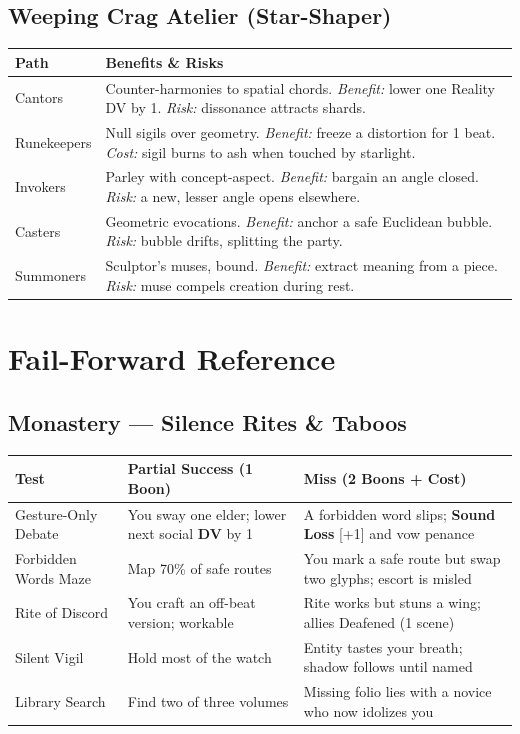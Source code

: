 \documentclass[11pt]{article}
\newcommand{\Clock}[2]{\textbf{#1} [#2]}
\newcommand{\Term}[1]{\textbf{#1}}
\newcommand{\DV}{\Term{DV}}
\begin{document}
\subsection*{Weeping Crag Atelier (Star-Shaper)}
\begin{tabularx}{\linewidth}{@{}l X@{}}
\toprule
\textbf{Path} & \textbf{Benefits \& Risks}\\
\midrule
Cantors & Counter-harmonies to spatial chords. \emph{Benefit:} lower one Reality DV by 1. \emph{Risk:} dissonance attracts shards.\\
Runekeepers & Null sigils over geometry. \emph{Benefit:} freeze a distortion for 1 beat. \emph{Cost:} sigil burns to ash when touched by starlight.\\
Invokers & Parley with concept-aspect. \emph{Benefit:} bargain an angle closed. \emph{Risk:} a new, lesser angle opens elsewhere.\\
Casters & Geometric evocations. \emph{Benefit:} anchor a safe Euclidean bubble. \emph{Risk:} bubble drifts, splitting the party.\\
Summoners & Sculptor's muses, bound. \emph{Benefit:} extract meaning from a piece. \emph{Risk:} muse compels creation during rest.\\
\bottomrule
\end{tabularx}

\section{Fail-Forward Reference}
\label{app:fail-forward}
\subsection*{Monastery --- Silence Rites \& Taboos}
\begin{tabularx}{\linewidth}{@{}l X X@{}}
\toprule
\textbf{Test} & \textbf{Partial Success (1 Boon)} & \textbf{Miss (2 Boons + Cost)}\\
\midrule
Gesture-Only Debate & You sway one elder; lower next social \DV{} by 1 & A forbidden word slips; \Clock{Sound Loss}{+1} and vow penance\\
Forbidden Words Maze & Map 70\% of safe routes & You mark a safe route but swap two glyphs; escort is misled\\
Rite of Discord & You craft an off-beat version; workable & Rite works but stuns a wing; allies Deafened (1 scene)\\
Silent Vigil & Hold most of the watch & Entity tastes your breath; shadow follows until named\\
Library Search & Find two of three volumes & Missing folio lies with a novice who now idolizes you\\
\bottomrule
\end{tabularx}
\end{document}
